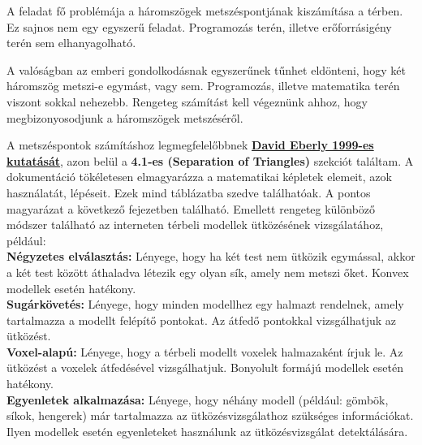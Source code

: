 
A feladat fő problémája a háromszögek metszéspontjának kiszámítása a térben. Ez sajnos nem egy egyszerű feladat. Programozás terén, illetve erőforrásigény terén sem elhanyagolható.

A valóságban az emberi gondolkodásnak egyszerűnek tűnhet eldönteni, hogy két háromszög metszi-e egymást, vagy sem. Programozás, illetve matematika terén viszont sokkal nehezebb. Rengeteg számítást kell végeznünk ahhoz, hogy megbizonyosodjunk a háromszögek metszéséről.

A metszéspontok számításhoz legmegfelelőbbnek \textbf{\href{https://www.geometrictools.com/Documentation/DynamicCollisionDetection.pdf}{David Eberly 1999-es kutatását}}, azon belül a \textbf{4.1-es (Separation of Triangles)} szekciót találtam. A dokumentáció tökéletesen elmagyarázza a matematikai képletek elemeit, azok használatát, lépéseit. Ezek mind táblázatba szedve találhatóak. A pontos magyarázat a következő fejezetben található. Emellett rengeteg különböző módszer található az interneten térbeli modellek ütközésének vizsgálatához, például:\\

\textbullet\textbf{Négyzetes elválasztás:} Lényege, hogy ha két test nem ütközik egymással, akkor a két test között áthaladva létezik egy olyan sík, amely nem metszi őket. Konvex modellek esetén hatékony. \\

\textbullet\textbf{Sugárkövetés:} Lényege, hogy minden modellhez egy halmazt rendelnek, amely tartalmazza a modellt felépítő pontokat. Az átfedő pontokkal vizsgálhatjuk az ütközést. \\

\textbullet\textbf{Voxel-alapú:} Lényege, hogy a térbeli modellt voxelek halmazaként írjuk le. Az ütközést a voxelek átfedésével vizsgálhatjuk. Bonyolult formájú modellek esetén hatékony. \\

\textbullet\textbf{Egyenletek alkalmazása:} Lényege, hogy néhány modell (például: gömbök, síkok, hengerek) már tartalmazza az ütközésvizsgálathoz szükséges információkat. Ilyen modellek esetén egyenleteket használunk az ütközésvizsgálat detektálására. \\